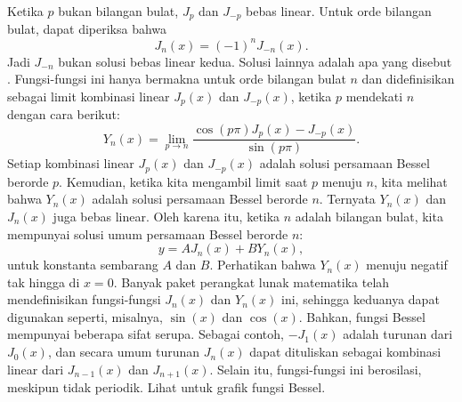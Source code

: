 Ketika $p$ bukan bilangan bulat, $J_p$
dan $J_{-p}$ bebas linear.
Untuk orde bilangan bulat, dapat diperiksa bahwa
\begin{equation*}
J_n(x) = {(-1)}^nJ_{-n}(x) .
\end{equation*}
Jadi $J_{-n}$ bukan solusi bebas linear
kedua. Solusi lainnya adalah apa yang disebut
\emph{}. Fungsi-fungsi ini hanya
bermakna untuk orde bilangan bulat $n$ dan
didefinisikan sebagai limit kombinasi linear $J_p(x)$ dan $J_{-p}(x)$, ketika
$p$ mendekati $n$ dengan
cara berikut:
\begin{equation*}
Y_n(x) = \lim_{p\to n} \frac{\cos(p \pi) J_p(x) - J_{-p}(x)}{\sin(p \pi)} .
\end{equation*}
Setiap kombinasi linear $J_p(x)$ dan $J_{-p}(x)$ adalah solusi
persamaan Bessel berorde $p$. Kemudian, ketika kita mengambil limit saat $p$
menuju $n$, kita melihat bahwa $Y_n(x)$ adalah solusi persamaan Bessel
berorde $n$. Ternyata $Y_n(x)$ dan $J_n(x)$ juga bebas
linear. Oleh karena itu, ketika $n$ adalah bilangan bulat, kita mempunyai
solusi umum persamaan Bessel berorde $n$:
\begin{equation*}
y = A J_n(x) + B Y_n(x) ,
\end{equation*}
untuk konstanta sembarang $A$ dan $B$. Perhatikan bahwa
$Y_n(x)$ menuju negatif tak hingga di $x=0$. Banyak paket perangkat lunak
matematika telah mendefinisikan
fungsi-fungsi $J_n(x)$ dan $Y_n(x)$ ini, sehingga keduanya dapat digunakan
seperti, misalnya, $\sin(x)$ dan $\cos(x)$. Bahkan, fungsi Bessel
mempunyai beberapa sifat serupa. Sebagai contoh, $-J_1(x)$ adalah turunan
dari $J_0(x)$, dan secara umum turunan $J_n(x)$ dapat dituliskan sebagai kombinasi
linear dari $J_{n-1}(x)$ dan $J_{n+1}(x)$. Selain itu, fungsi-fungsi ini
berosilasi, meskipun tidak periodik. Lihat
 untuk grafik fungsi Bessel.
\begin{myfig}
\capstart
\caption{Grafik $J_0(x)$ dan $J_1(x)$ pada grafik pertama
serta $Y_0(x)$ dan $Y_1(x)$ pada grafik kedua.\label{bessel:graphsfig}}
\end{myfig}

